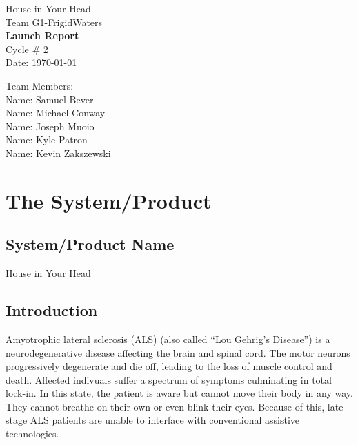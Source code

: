 \documentclass{report}
\begin{document}
\begin{titlepage}
    \begin{center}
        \begin{huge}
        House in Your Head \\[1cm]
        Team G1-FrigidWaters \\[2.2cm]
        { \bfseries Launch Report } \\[1cm]
        Cycle \# 2\\[2.2cm]
        Date: \required\today\\[1cm]
        \end{huge}
    \end{center}
    \null \vfill
    \begin{large}
        Team Members: \\[0.5cm]
        Name: Samuel Bever\\[0.5cm]
        Name: Michael Conway\\[0.5cm]
        Name: Joseph Muoio\\[0.5cm]
        Name: Kyle Patron\\[0.5cm]
        Name: Kevin Zakszewski
    \end{large}
\end{titlepage}

\section*{\centering The System/Product}

\subsection*{System/Product Name}

House in Your Head

\subsection*{Introduction}

Amyotrophic lateral sclerosis (ALS) (also called ``Lou Gehrig's Disease'') is
a neurodegenerative disease affecting the brain and spinal cord. The motor
neurons progressively degenerate and die off, leading to the loss of muscle
control and death. Affected indivuals suffer a spectrum of symptoms
culminating in total lock-in. In this state, the patient is aware but cannot
move their body in any way. They cannot breathe on their own or even blink
their eyes. Because of this, late-stage ALS patients are unable to interface
with conventional assistive technologies. \cite{ALSsource}
\end{document}
